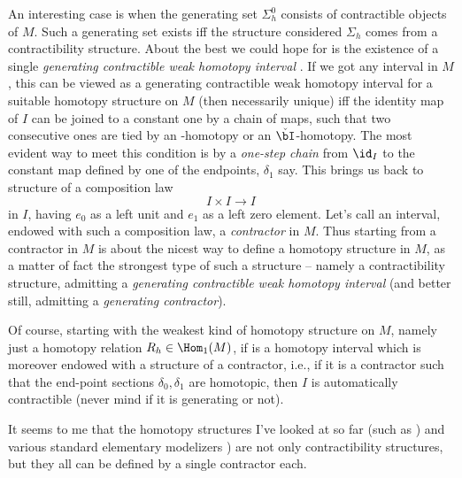 An interesting case is when the generating set $\Sigma_h^0$ consists
of contractible objects of $M$. Such a generating set exists if{f} the
structure considered $\Sigma_h$ comes from a contractibility
structure. About the best we could hope for is the existence of a
single \emph{generating contractible weak homotopy interval} \bI. If
we got any interval \bI{} in $M$, this can be viewed as a generating
contractible weak homotopy interval for a suitable homotopy structure
on $M$ (then necessarily unique) if{f} the identity map of $I$ can be
joined to a constant one by a chain of maps, such that two consecutive
ones are tied by an \bI-homotopy or an $\check\bI$-homotopy. The most
evident way to meet this condition is by a \emph{one-step chain} from
$\id_I$ to the constant map defined by one of the endpoints,
$\delta_1$ say. This brings us back to structure of a composition law
\[ I\times I\to I\]
in $I$, having $e_0$ as a left unit and $e_1$ as a left zero
element. Let's call an interval, endowed with such a composition law,
a \emph{contractor} in $M$. Thus starting from a contractor in $M$ is
about the nicest way to define a homotopy structure in $M$, as a
matter of fact the strongest type of such a structure -- namely a
contractibility structure, admitting a \emph{generating contractible
  weak homotopy interval} (and better still, admitting a
\emph{generating contractor}).

Of course, starting with the weakest kind of homotopy structure on
$M$, namely just a homotopy relation $R_h\in\Hom_1(M)$, if \bI{} is a
homotopy interval which is moreover endowed with a structure of a
contractor, i.e., if it is a contractor such that the end-point
sections $\delta_0,\delta_1$ are homotopic, then $I$ is automatically
contractible (never mind if it is generating or not).

It seems to me that the homotopy structures I've looked at so far
(such as \Cat) and various standard elementary modelizers \Ahat) are
not only contractibility structures, but they all can be defined by a
single contractor each.

